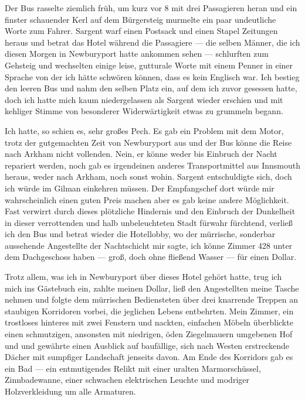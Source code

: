 Der Bus rasselte ziemlich früh, um kurz vor 8 mit drei Passagieren heran und ein finster schauender Kerl auf dem Bürgersteig murmelte ein paar undeutliche Worte zum Fahrer. Sargent warf einen Postsack und einen Stapel Zeitungen heraus und betrat das Hotel während die Passagiere --- die selben Männer, die ich diesen Morgen in Newburyport hatte ankommen sehen --- schlurften zum Gehsteig und wechselten einige leise, gutturale Worte mit einem Penner in einer Sprache von der ich hätte schwören können, dass es kein Englisch war. Ich bestieg den leeren Bus und nahm den selben Platz ein, auf dem ich zuvor gesessen hatte, doch ich hatte mich kaum niedergelassen als Sargent wieder erschien und mit kehliger Stimme von besonderer Widerwärtigkeit etwas zu grummeln begann.

Ich hatte, so schien es, sehr großes Pech. Es gab ein Problem mit dem Motor, trotz der gutgemachten Zeit von Newburyport aus und der Bus könne die Reise nach Arkham nicht vollenden. Nein, er könne weder bis Einbruch der Nacht repariert werden, noch gab es irgendeinen anderes Transportmittel aus Innsmouth heraus, weder nach Arkham, noch sonst wohin. Sargent entschuldigte sich, doch ich würde im Gilman einkehren müssen. Der Empfangschef dort würde mir wahrscheinlich einen guten Preis machen aber es gab keine andere Möglichkeit. Fast verwirrt durch dieses plötzliche Hindernis und den Einbruch der Dunkelheit in dieser verrottenden und halb unbeleuchteten Stadt fürwahr fürchtend, verließ ich den Bus und betrat wieder die Hotellobby, wo der mürrische, sonderbar aussehende Angestellte der Nachtschicht mir sagte, ich könne Zimmer 428 unter dem Dachgeschoss haben --- groß, doch ohne fließend Wasser --- für einen Dollar.

Trotz allem, was ich in Newburyport über dieses Hotel gehört hatte, trug ich mich ins Gästebuch ein, zahlte meinen Dollar, ließ den Angestellten meine Tasche nehmen und folgte dem mürrischen Bediensteten über drei knarrende Treppen an staubigen Korridoren vorbei, die jeglichen Lebens entbehrten. Mein Zimmer, ein trostloses hinteres mit zwei Fenstern und nackten, einfachen Möbeln überblickte einen schmutzigen, ansonsten mit niedrigen, öden Ziegelmauern umgebenen Hof und und gewährte einen Ausblick auf baufällige, sich nach Westen erstreckende Dächer mit sumpfiger Landschaft jenseits davon. Am Ende des Korridors gab es ein Bad --- ein entmutigendes Relikt mit einer uralten Marmorschüssel, Zinnbadewanne, einer schwachen elektrischen Leuchte und modriger Holzverkleidung um alle Armaturen.

